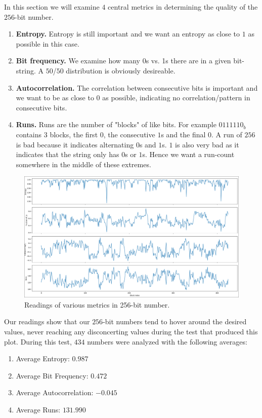 In this section we will examine \(4\) central metrics in 
determining the quality of the \(256\)-bit number. 
\begin{enumerate}
    \item \textbf{Entropy.} Entropy is still important and 
        we want an entropy as close to \(1\) as possible in 
        this case. 
    \item \textbf{Bit frequency.} We examine how many 0s vs. 1s 
        there are in a given bit-string. A \(50\)/\(50\) 
        distribution is obviously desireable.
    \item \textbf{Autocorrelation.} The correlation between 
        consecutive bits is important and we want 
        to be as close to \(0\) as possible, indicating 
        no correlation/pattern in consecutive bits.
    \item \textbf{Runs.} Runs are the number of "blocks" of like 
        bits. For example \(0111110_b\) contains \(3\) blocks, 
        the first \(0\), the consecutive \(1\)s and the final 
        \(0\). A run of \(256\) is bad because it indicates 
        alternating \(0\)s and \(1\)s. \(1\) is also very bad 
        as it indicates that the string only has \(0\)s or \(1\)s.
        Hence we want a run-count somewhere in the middle of these 
        extremes.
\end{enumerate}

\begin{figure}[h]
    \centering
    \includegraphics[width=0.9\linewidth]{./images/256SUITE_PLOT.png} 
    \caption{Readings of various metrics in 256-bit number.}
    \label{fig:256_suite}
\end{figure}

Our readings show that our \(256\)-bit numbers tend to 
hover around the desired values, never reaching any 
disconcerting values during the test that produced this 
plot. During this test, \(434\) numbers were analyzed with 
the following averages: 
\begin{enumerate}
    \item Average Entropy: \(0.987\) 
    \item Average Bit Frequency: \(0.472\)
    \item Average Autocorrelation: \(-0.045\) 
    \item Average Runs: \(131.990\)
\end{enumerate}



